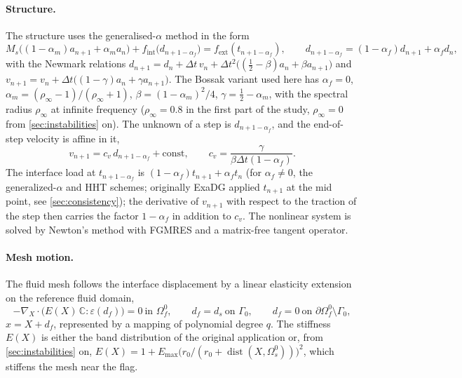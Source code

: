 \documentclass[11pt,a4paper]{article}
\theoremstyle{definition}
\theoremstyle{remark}
\newcommand{\G}{\Gamma}
\begin{document}
\paragraph{Structure.} The structure uses the generalised-$\alpha$ method in the form
\begin{equation}\label{eq:genalpha}
  M_s\big((1-\alpha_m)a_{n+1}+\alpha_ma_n\big)+f_{\mathrm{int}}\big(d_{n+1-\alpha_f}\big)
  =f_{\mathrm{ext}}(t_{n+1-\alpha_f}),\qquad d_{n+1-\alpha_f}=(1-\alpha_f)d_{n+1}+\alpha_fd_n,
\end{equation}
with the Newmark relations
$d_{n+1}=d_n+\Delta t\,v_n+\Delta t^2\big((\tfrac12-\beta)a_n+\beta a_{n+1}\big)$ and
$v_{n+1}=v_n+\Delta t\big((1-\gamma)a_n+\gamma a_{n+1}\big)$. The Bossak variant used here has
$\alpha_f=0$, $\alpha_m=(\rho_\infty-1)/(\rho_\infty+1)$, $\beta=(1-\alpha_m)^2/4$,
$\gamma=\tfrac12-\alpha_m$, with the spectral radius $\rho_\infty$ at infinite frequency
($\rho_\infty=0.8$ in the first part of the study, $\rho_\infty=0$ from \cref{sec:instabilities}
on). The unknown of a step is $d_{n+1-\alpha_f}$, and the end-of-step velocity is affine in it,
\begin{equation}\label{eq:cv}
  v_{n+1}=c_v\,d_{n+1-\alpha_f}+\text{const},\qquad c_v=\frac{\gamma}{\beta\Delta t(1-\alpha_f)} .
\end{equation}
The interface load at $t_{n+1-\alpha_f}$ is $(1-\alpha_f)t_{n+1}+\alpha_ft_n$ (for $\alpha_f\neq0$,
the generalized-$\alpha$ and HHT schemes; originally ExaDG applied $t_{n+1}$ at the mid point, see
\cref{sec:consistency}); the derivative of $v_{n+1}$ with respect to the traction of the step then
carries the factor $1-\alpha_f$ in addition to $c_v$. The nonlinear system is solved by Newton's
method with FGMRES and a matrix-free tangent operator.

\paragraph{Mesh motion.} The fluid mesh follows the interface displacement by a linear elasticity
extension on the reference fluid domain,
\begin{equation}\label{eq:ale}
  -\nabla_X\cdot\big(E(X)\,\mathbb C:\varepsilon(d_f)\big)=0\ \text{in }\Omega_f^0,\qquad
  d_f=d_s\ \text{on }\G_0,\qquad d_f=0\ \text{on }\partial\Omega_f^0\setminus\G_0,
\end{equation}
$x=X+d_f$, represented by a mapping of polynomial degree $q$. The stiffness $E(X)$ is either the
band distribution of the original application or, from \cref{sec:instabilities} on,
$E(X)=1+E_{\max}\big(r_0/(r_0+\operatorname{dist}(X,\Omega_s^0))\big)^2$, which stiffens the
mesh near the flag.
\end{document}
